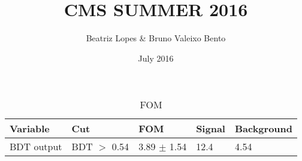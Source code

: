 \documentclass{article}
\title{CMS SUMMER 2016}
\author{Beatriz Lopes &  Bruno Valeixo Bento}
\date{July 2016}
\begin{document}
\maketitle
\begin{table}[!h]
\centering
\begin{tabular}{lllll}
\hline
Variable & Cut & FOM & Signal & Background\\
\hline
BDT output & BDT $>$ 0.54 & 3.89 $\pm$ 1.54&12.4&4.54\\
\hline
\end{tabular}
\caption{FOM}
\end{table}
\end{document}
